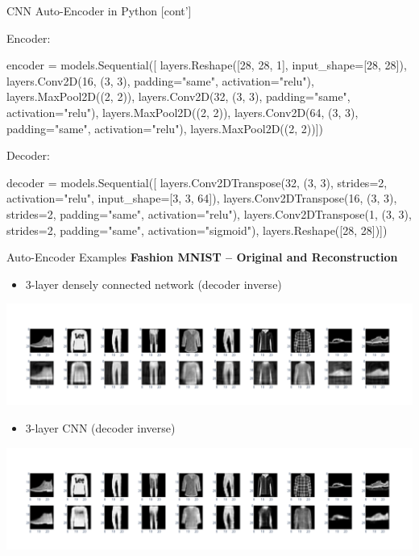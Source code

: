\documentclass[ignorenonframetext,xcolor=x11names]{beamer}
\begin{document}
\begin{frame}[fragile]{CNN Auto-Encoder in Python \small [cont']}

Encoder:
\begin{pythoncode}
encoder = models.Sequential([
    layers.Reshape([28, 28, 1], input_shape=[28, 28]),
    layers.Conv2D(16, (3, 3), 
                  padding="same", activation="relu"),
    layers.MaxPool2D((2, 2)),
    layers.Conv2D(32, (3, 3), 
                  padding="same", activation="relu"),
    layers.MaxPool2D((2, 2)),
    layers.Conv2D(64, (3, 3), 
                  padding="same", activation="relu"),
    layers.MaxPool2D((2, 2))])
\end{pythoncode}

Decoder:
\begin{pythoncode}
decoder = models.Sequential([
    layers.Conv2DTranspose(32, (3, 3), strides=2, 
               activation="relu", input_shape=[3, 3, 64]),
    layers.Conv2DTranspose(16, (3, 3), strides=2, 
               padding="same", activation="relu"),
    layers.Conv2DTranspose(1, (3, 3), strides=2, 
               padding="same", activation="sigmoid"),
    layers.Reshape([28, 28])])
\end{pythoncode}
\end{frame}

\begin{frame}{Auto-Encoder Examples}
\textbf{Fashion MNIST -- Original and Reconstruction}
\begin{itemize}
   \item 3-layer densely connected network (decoder inverse)
\end{itemize} 
\begin{center}
\includegraphics[width=\textwidth]{autoencoder_sample_dense.png} \\
\end{center}

\begin{itemize}
   \item 3-layer CNN (decoder inverse)
\end{itemize} 
\begin{center}
\includegraphics[width=\textwidth]{autoencoder_sample_cnn.png} \\
\end{center}
\end{frame}
\end{document}
